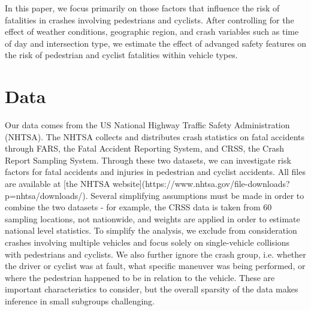\documentclass[12pt]{article}
\begin{document}
In this paper, we focus primarily on those factors that influence the risk of fatalities in crashes involving pedestrians
and cyclists. After controlling for the effect of weather conditions,
geographic region, and crash variables such as time of day and intersection type, we estimate the effect
of advanged safety features on the risk of pedestrian and cyclist fatalities within vehicle types.


\section{Data}

Our data comes from the US National Highway Traffic Safety Administration (NHTSA). The NHTSA collects and distributes
crash statistics on fatal accidents through FARS, the Fatal Accident Reporting System, and CRSS, the Crash Report
Sampling System. Through these two datasets, we can investigate risk factors for fatal accidents and injuries in
pedestrian and cyclist accidents. All files are available at
    [the NHTSA website](https://www.nhtsa.gov/file-downloads?p=nhtsa/downloads/). Several simplifying assumptions must be
made in order to combine the two datasets - for example, the CRSS data is taken from 60 sampling locations, not
nationwide, and weights are applied in order to estimate national level
statistics\cite{national_highway_traffic_safety_administration_crash_nodate}.  To simplify the analysis, we exclude
from consideration crashes involving multiple vehicles and focus solely on single-vehicle collisions with pedestrians
and cyclists. We also further ignore the crash group, i.e. whether the driver or cyclist was at fault, what
specific maneuver was being performed, or where the pedestrian happened to be in relation to the vehicle. These are
important characteristics to consider, but the overall sparsity of the data makes inference in small subgroups
challenging.

\end{document}
